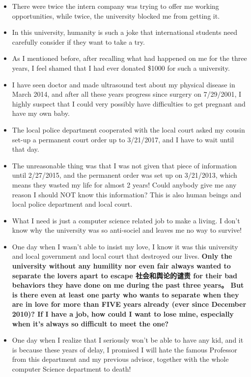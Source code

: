 \documentclass[9pt,b5paper]{article}
\begin{document}
\begin{itemize}
\item There were twice the intern company was trying to offer me working opportunities, while twice, the university blocked me from getting it.
\item In this university, humanity is such a joke that international students need carefully consider if they want to take a try.
\item As I mentioned before, after recalling what had happened on me for the three years, I feel shamed that I had ever donated \$1000 for such a university.
\item I have seen doctor and made ultrasound test about my physical disease in March 2014, and after all these years progress since surgery on 7/29/2001, I highly suspect that I could very possibly have difficulties to get pregnant and have my own baby.
\item The local police department cooperated with the local court asked my cousin set-up a permanent court order up to 3/21/2017, and I have to wait until that day.
\item The unreasonable thing was that I was not given that piece of information until 2/27/2015, and the permanent order was set up on 3/21/2013, which means they wasted my life for almost 2 years! Could anybody give me any reason I should NOT know this information? This is also human beings and local police department and local court.
\item What I need is just a computer science related job to make a living. I don't know why the university was so anti-sociel and leaves me no way to survive!
\item One day when I wasn't able to insist my love, I know it was this university and local government and local court that destroyed our lives. \textbf{Only the university without any humility nor even fair always wanted to separate the lovers apart to escape 社会和舆论的谴责 for their bad behaviors they have done on me during the past three years。 But is there even at least one party who wants to separate when they are in love for more than FIVE years already (ever since December 2010)? If I have a job, how could I want to lose mine, especially when it's always so difficult to meet the one?}
\item One day when I realize that I seriously won't be able to have any kid, and it is because these years of delay, I promised I will hate the famous Professor from this department and my previous advisor, together with the whole computer Science department to death!
\end{itemize}
\end{document}

